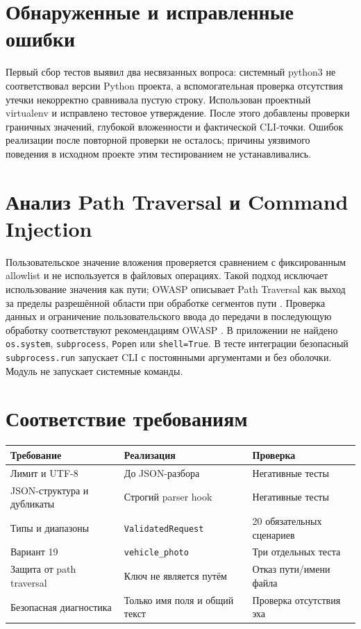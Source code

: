 \documentclass[12pt,a4paper]{article}
\begin{document}
\section{Обнаруженные и исправленные ошибки}
Первый сбор тестов выявил два несвязанных вопроса: системный python3 не соответствовал версии Python проекта, а вспомогательная проверка отсутствия утечки некорректно сравнивала пустую строку. Использован проектный virtualenv и исправлено тестовое утверждение. После этого добавлены проверки граничных значений, глубокой вложенности и фактической CLI-точки. Ошибок реализации после повторной проверки не осталось; причины уязвимого поведения в исходном проекте этим тестированием не устанавливались.

\section{Анализ Path Traversal и Command Injection}
Пользовательское значение вложения проверяется сравнением с фиксированным allowlist и не используется в файловых операциях. Такой подход исключает использование значения как пути; OWASP описывает Path Traversal как выход за пределы разрешённой области при обработке сегментов пути \cite{owasp-path}. Проверка данных и ограничение пользовательского ввода до передачи в последующую обработку соответствуют рекомендациям OWASP \cite{owasp-input,owasp-command}. В приложении не найдено \texttt{os.system}, \texttt{subprocess}, \texttt{Popen} или \texttt{shell=True}. В тесте интеграции безопасный \texttt{subprocess.run} запускает CLI с постоянными аргументами и без оболочки. Модуль не запускает системные команды.

\section{Соответствие требованиям}
\begin{longtable}{p{5cm}p{5cm}p{4cm}}
\toprule Требование & Реализация & Проверка\\\midrule
Лимит и UTF-8 & До JSON-разбора & Негативные тесты\\
JSON-структура и дубликаты & Строгий parser hook & Негативные тесты\\
Типы и диапазоны & \texttt{ValidatedRequest} & 20 обязательных сценариев\\
Вариант 19 & \texttt{vehicle\_photo} & Три отдельных теста\\
Защита от path traversal & Ключ не является путём & Отказ пути/имени файла\\
Безопасная диагностика & Только имя поля и общий текст & Проверка отсутствия эха\\
\bottomrule
\end{longtable}
\end{document}
